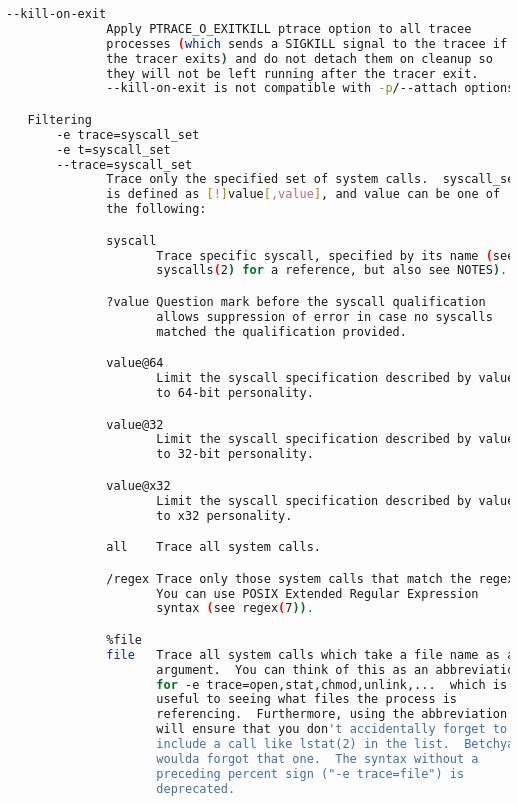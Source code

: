 {{\begin{lstlisting}[language=bash]
       --kill-on-exit
              Apply PTRACE_O_EXITKILL ptrace option to all tracee
              processes (which sends a SIGKILL signal to the tracee if
              the tracer exits) and do not detach them on cleanup so
              they will not be left running after the tracer exit.
              --kill-on-exit is not compatible with -p/--attach options.

   Filtering
       -e trace=syscall_set
       -e t=syscall_set
       --trace=syscall_set
              Trace only the specified set of system calls.  syscall_set
              is defined as [!]value[,value], and value can be one of
              the following:

              syscall
                     Trace specific syscall, specified by its name (see
                     syscalls(2) for a reference, but also see NOTES).

              ?value Question mark before the syscall qualification
                     allows suppression of error in case no syscalls
                     matched the qualification provided.

              value@64
                     Limit the syscall specification described by value
                     to 64-bit personality.

              value@32
                     Limit the syscall specification described by value
                     to 32-bit personality.

              value@x32
                     Limit the syscall specification described by value
                     to x32 personality.

              all    Trace all system calls.

              /regex Trace only those system calls that match the regex.
                     You can use POSIX Extended Regular Expression
                     syntax (see regex(7)).

              %file
              file   Trace all system calls which take a file name as an
                     argument.  You can think of this as an abbreviation
                     for -e trace=open,stat,chmod,unlink,...  which is
                     useful to seeing what files the process is
                     referencing.  Furthermore, using the abbreviation
                     will ensure that you don't accidentally forget to
                     include a call like lstat(2) in the list.  Betchya
                     woulda forgot that one.  The syntax without a
                     preceding percent sign ("-e trace=file") is
                     deprecated.


\end{lstlisting}}}
